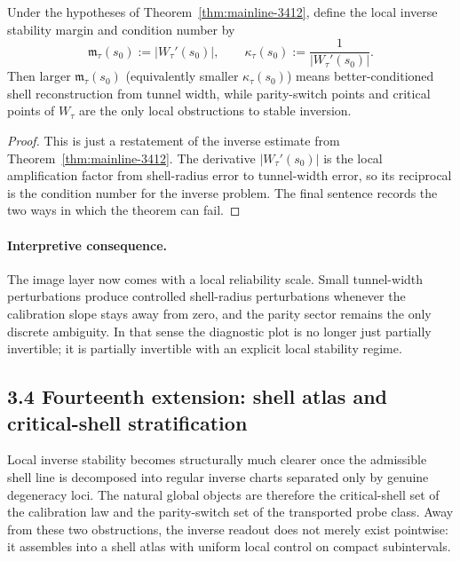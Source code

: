 \begin{corollary}
\label{cor:mainline-3412-condition}
Under the hypotheses of Theorem~\ref{thm:mainline-3412}, define the local inverse stability margin and condition number by
\[
  \mathfrak m_\tau(s_0):=|W_\tau'(s_0)|,
  \qquad
  \kappa_\tau(s_0):=\frac{1}{|W_\tau'(s_0)|}.
\]
Then larger $\mathfrak m_\tau(s_0)$ (equivalently smaller $\kappa_\tau(s_0)$) means better-conditioned shell reconstruction from tunnel width, while parity-switch points and critical points of $W_\tau$ are the only local obstructions to stable inversion.
\end{corollary}

\begin{proof}
This is just a restatement of the inverse estimate from Theorem~\ref{thm:mainline-3412}. The derivative $|W_\tau'(s_0)|$ is the local amplification factor from shell-radius error to tunnel-width error, so its reciprocal is the condition number for the inverse problem. The final sentence records the two ways in which the theorem can fail.
\end{proof}

\paragraph{Interpretive consequence.}
The image layer now comes with a local reliability scale. Small tunnel-width perturbations produce controlled shell-radius perturbations whenever the calibration slope stays away from zero, and the parity sector remains the only discrete ambiguity. In that sense the diagnostic plot is no longer just partially invertible; it is partially invertible with an explicit local stability regime.

\subsection*{3.4 Fourteenth extension: shell atlas and critical-shell stratification}
Local inverse stability becomes structurally much clearer once the admissible shell line is decomposed into regular inverse charts separated only by genuine degeneracy loci. The natural global objects are therefore the critical-shell set of the calibration law and the parity-switch set of the transported probe class. Away from these two obstructions, the inverse readout does not merely exist pointwise: it assembles into a shell atlas with uniform local control on compact subintervals.

